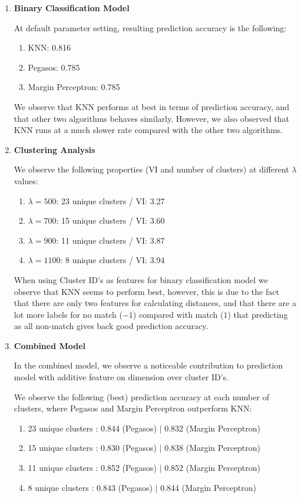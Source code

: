 \documentclass[11pt,letterpaper]{article}
\begin{document}
\begin{enumerate}
\item \textbf{Binary Classification Model}

At default parameter setting, resulting prediction accuracy is the following:
\begin{enumerate}
\item KNN: 0.816
\item Pegasos: 0.785
\item Margin Perceptron: 0.785
\end{enumerate}

We observe that KNN performs at best in terms of prediction accuracy, and that other two algorithms behaves similarly. However, we also observed that KNN runs at a much slower rate compared with the other two algorithms.

\item \textbf{Clustering Analysis}

We observe the following properties (VI and number of clusters) at different $\lambda$ values:

\begin{enumerate}
\item $\lambda=500$: 23 unique clusters / VI: 3.27
\item $\lambda=700$: 15 unique clusters / VI: 3.60
\item $\lambda=900$: 11 unique clusters / VI: 3.87
\item $\lambda=1100$: 8 unique clusters / VI: 3.94
\end{enumerate}

When using Cluster ID's as features for binary classification model we observe that KNN seems to perform best, however, this is due to the fact that there are only two features for calculating distances, and that there are a lot more labels for no match ($-1$) compared with match ($1$) that predicting as all non-match gives back good prediction accuracy.

\item \textbf{Combined Model}

In the combined model, we observe a noticeable contribution to prediction model with additive feature on dimension over cluster ID's.

We observe the following (best) prediction accuracy at each number of clusters, where Pegasos and Margin Perceptron outperform KNN:

\begin{enumerate}
\item 23 unique clusters : 0.844 (Pegasos) $|$ 0.832 (Margin Perceptron)
\item 15 unique clusters : 0.830 (Pegasos) $|$ 0.838 (Margin Perceptron)
\item 11 unique clusters : 0.852 (Pegasos) $|$ 0.852 (Margin Perceptron)
\item 8 unique clusters : 0.843 (Pegasos) $|$ 0.844 (Margin Perceptron)
\end{enumerate}


\end{enumerate}
\end{document}

